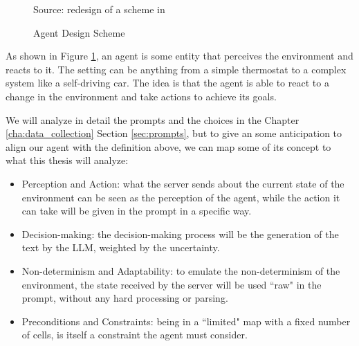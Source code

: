 \vspace{1cm} %
\begin{figure}[h!]
  \centering
  \caption{Agent Design Scheme}
  { Source: redesign of a scheme in \cite{wooldridge2002multiagent}} \label{fig:agent_scheme}
\end{figure}
\vspace{1cm} %

As shown in Figure \ref{fig:agent_scheme}, an agent is some entity that perceives
the environment and reacts to it. The setting can be anything from a simple
thermostat to a complex system like a self-driving car. The idea is that the agent
is able to react to a change in the environment and take actions to achieve its goals.

We will analyze in detail the prompts and the choices in the Chapter \ref{cha:data_collection}
Section \ref{sec:prompts}, but to give an some anticipation to align our agent
with the definition above, we can map some of its concept to what this thesis will
analyze:
\begin{itemize}
  \item Perception and Action: what the server sends about the current state of
    the environment can be seen as the perception of the agent, while the action
    it can take will be given in the prompt in a specific way.

  \item Decision-making: the decision-making process will be the generation of
    the text by the LLM, weighted by the uncertainty.

  \item Non-determinism and Adaptability: to emulate the non-determinism of the
    environment, the state received by the server will be used ``raw" in the
    prompt, without any hard processing or parsing.

  \item Preconditions and Constraints: being in a ``limited" map with a fixed number
    of cells, is itself a constraint the agent must consider.
\end{itemize}

